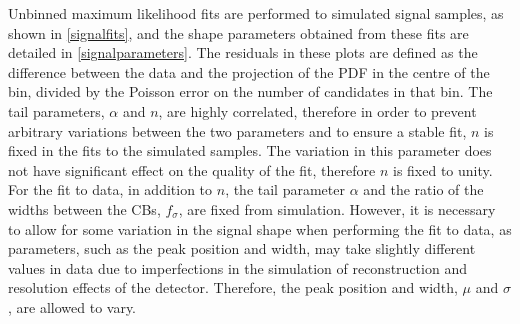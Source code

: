 Unbinned maximum likelihood fits are performed to simulated signal samples, as shown in \fig\ref{signalfits}, and the shape parameters obtained from these fits are detailed in \tab\ref{signalparameters}. The residuals in these plots are defined as the difference between the data and the projection of the PDF in the centre of the bin, divided by the Poisson error on the number of candidates in that bin. The tail parameters, $\alpha$ and $n$, are highly correlated, therefore in order to prevent arbitrary variations between the two parameters and to ensure a stable fit, $n$ is fixed in the fits to the simulated samples. The variation in this parameter does not have significant effect on the quality of the fit, therefore $n$ is fixed to unity. For the fit to data, in addition to $n$, the tail parameter $\alpha$ and the ratio of the widths between the CBs, $f_{\sigma}$, are fixed from simulation. However, it is necessary to allow for some variation in the signal shape when performing the fit to data, as parameters, such as the peak position and width, may take slightly different values in data due to imperfections in the simulation of reconstruction and resolution effects of the \lhcb detector. Therefore, the peak position and width, $\mu$ and $\sigma$, are allowed to vary.

